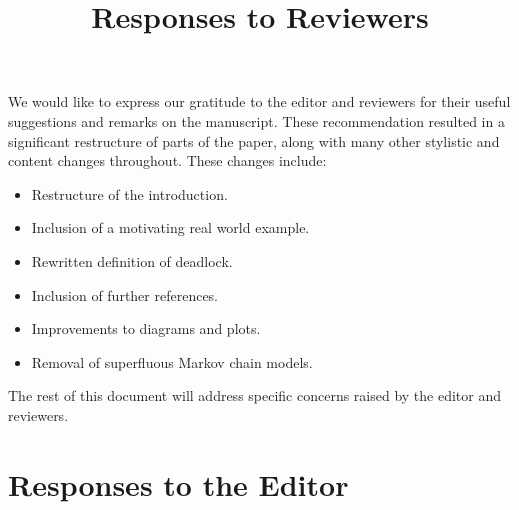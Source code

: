 \documentclass{article}
\title{Responses to Reviewers}
\author{}
\date{}
\begin{document}
\maketitle

We would like to express our gratitude to the editor and reviewers for their
useful suggestions and remarks on the manuscript.
These recommendation resulted in a significant restructure of parts of the
paper, along with many other stylistic and content changes throughout.
These changes include:

\begin{itemize}
	\item Restructure of the introduction.
	\item Inclusion of a motivating real world example.
	\item Rewritten definition of deadlock.
	\item Inclusion of further references.
	\item Improvements to diagrams and plots.
	\item Removal of superfluous Markov chain models.
\end{itemize}

The rest of this document will address specific concerns raised by the editor
and reviewers.

\section*{Responses to the Editor}
\end{document}
